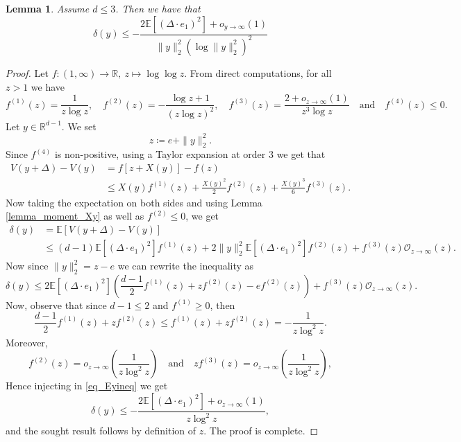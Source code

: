 \documentclass[a4paper, 11pt]{article}
\theoremstyle{plain}
\newtheorem{Lemma}[Theorem]{Lemma}
\theoremstyle{definition}
\newcommand{\E}{\mathbb{E}}
\newcommand{\R}{\mathbb{R}}
\numberwithin{equation}{section}
\begin{document}
\begin{Lemma}
    \label{lemma_RW}
    Assume $d\leq 3$. Then we have that 
        \[\delta(y)\leq-\frac{2\E[(\Delta\cdot e_1)^2]+o_{y\to\infty}(1)}{\|y\|_2^2(\log\|y\|_2^2)^2}\]
\end{Lemma}

\begin{proof}
    Let $f:(1,\infty)\to\R,~ z\mapsto\log\log z$. From direct computations, for all $z>1$ we have
    \begin{equation}
        \label{eq_fderivatives}
        f^{(1)}(z)=\frac{1}{z\log z},\quad f^{(2)}(z)=-\frac{\log z+1}{(z\log z)^2}, \quad f^{(3)}(z)=\frac{2+o_{z\to\infty}(1)}{z^3\log z}\quad\text{and}\quad f^{(4)}(z)\leq 0.
    \end{equation}
    Let $y\in\R^{d-1}$. We set
        \[z\coloneqq e+\|y\|_2^2.\]
    Since $f^{(4)}$ is non-positive, using a Taylor expansion at order $3$ we get that
        \begin{equation}
            \label{eq_taylor}
            \begin{split}
                V(y+\Delta)-V(y)&=f[z+X(y)]-f(z)\\
                &\leq X(y) f^{(1)}(z)+\frac{X(y)^2}{2}f^{(2)}(z)+\frac{X(y)^3}{6}f^{(3)}(z).
            \end{split}
        \end{equation}
    Now taking the expectation on both sides and using Lemma \ref{lemma_moment_Xy} as well as $f^{(2)}\leq 0$, we get
        \begin{equation*}
            \begin{split}
                \delta(y)&=\E[V(y+\Delta)-V(y)]\\
                &\leq (d-1)\E[(\Delta\cdot e_1)^2]f^{(1)}(z)+2\|y\|_2^2\E[(\Delta\cdot e_1)^2]f^{(2)}(z)+f^{(3)}(z)\mathcal O_{z\to\infty}(z).
            \end{split}
        \end{equation*}
    Now since $\|y\|_2^2=z-e$ we can rewrite the inequality as
        \begin{equation}
            \label{eq_Eyineq}
            \delta(y)\leq 2\E[(\Delta\cdot e_1)^2]\left(\frac{d-1}{2}f^{(1)}(z)+zf^{(2)}(z)-ef^{(2)}(z)\right)+f^{(3)}(z)\mathcal O_{z\to\infty}(z).
        \end{equation}
    Now, observe that since $d-1\leq 2$ and $f^{(1)}\geq 0$, then 
        \[\frac{d-1}{2}f^{(1)}(z)+zf^{(2)}(z)\leq f^{(1)}(z)+zf^{(2)}(z)=-\frac{1}{z\log^2z}.\] 
    Moreover,
        \[f^{(2)}(z)=o_{z\to\infty}\left(\frac{1}{z\log^2z}\right)\quad\text{and}\quad zf^{(3)}(z)=o_{z\to\infty}\left(\frac{1}{z\log^2z}\right),\]
    Hence injecting in \eqref{eq_Eyineq} we get
        \[\delta(y)\leq-\frac{2\E[(\Delta\cdot e_1)^2]+o_{z\to\infty}(1)}{z\log^2z},\]
    and the sought result follows by definition of $z$. The proof is complete.
\end{proof}
\end{document}
